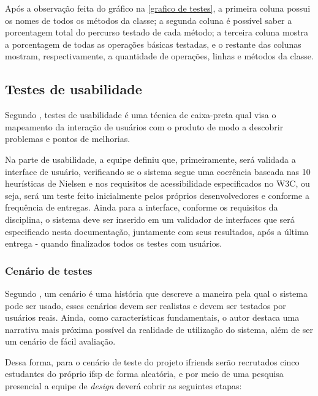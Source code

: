 Após a observação feita do gráfico na \autoref{grafico de testes}, a primeira coluna possui os nomes de todos os métodos da classe; a segunda coluna é possível saber a porcentagem total do percurso testado de cada método; a terceira coluna mostra a porcentagem de todas as operações básicas testadas, e o restante das colunas mostram, respectivamente, a quantidade de operações, linhas e métodos da classe.

\subsection{Testes de usabilidade}
Segundo , testes de usabilidade é uma técnica de caixa-preta qual visa o mapeamento da interação de usuários com o produto de modo a descobrir problemas e pontos de melhorias. 

Na parte de usabilidade, a equipe definiu que, primeiramente, será validada a interface de usuário, verificando se o sistema segue uma coerência baseada nas 10 heurísticas de Nielsen e nos requisitos de acessibilidade especificados no W3C, ou seja, será um teste feito inicialmente pelos próprios desenvolvedores e conforme a frequência de entregas. Ainda para a interface, conforme os requisitos da disciplina,  o sistema deve ser inserido em um validador de interfaces que será especificado nesta documentação, juntamente com seus resultados, após a última entrega - quando finalizados todos os testes com usuários.

\subsubsection{Cenário de testes}
Segundo , um cenário é uma história que descreve a maneira pela qual o sistema pode ser usado, esses cenários devem ser realistas e devem ser testados por usuários reais. Ainda, como características fundamentais, o autor  destaca uma narrativa mais próxima possível da realidade de utilização do sistema, além de ser um cenário de fácil avaliação. 

Dessa forma, para o cenário de teste do projeto \gls{ifriends} serão recrutados cinco estudantes do próprio \acs{ifsp} de forma aleatória, e por meio de uma pesquisa presencial a equipe de \textit{design} deverá cobrir as seguintes etapas: 


